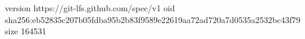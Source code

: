 version https://git-lfs.github.com/spec/v1
oid sha256:eb52835c207b05fdba95b2b83f9589e22619aa72ad720a7d0535a2532bc43f79
size 164531
